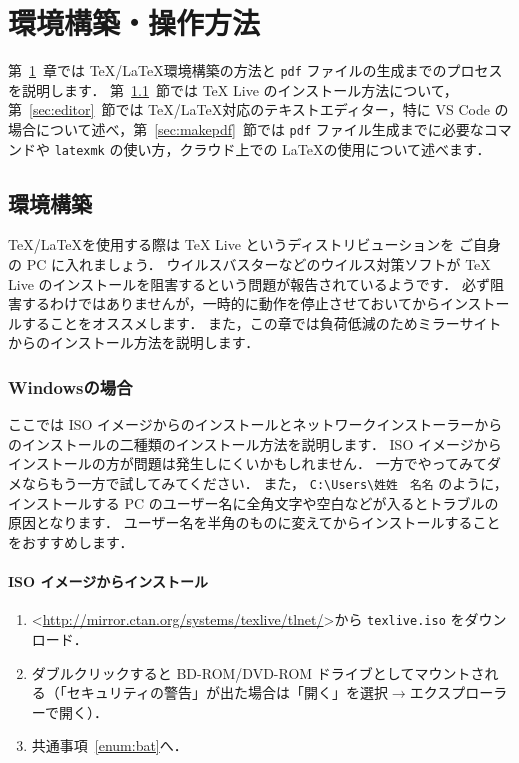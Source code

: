\chapter{環境構築・操作方法}
\label{ch:howtouse}

第~\ref{ch:howtouse}~章では \TeX/\LaTeX 環境構築の方法と \verb|pdf| ファイルの生成までのプロセスを説明します．
第~\ref{sec:environment}~節では TeX Live のインストール方法について，第~\ref{sec:editor}~節では \TeX/\LaTeX 対応のテキストエディター，特に VS Code の場合について述べ，第~\ref{sec:makepdf}~節では \verb|pdf| ファイル生成までに必要なコマンドや \verb|latexmk| の使い方，クラウド上での \LaTeX の使用について述べます．

\section{環境構築}
\label{sec:environment}

\TeX/\LaTeX を使用する際は TeX Live というディストリビューションを ご自身の PC に入れましょう．
ウイルスバスターなどのウイルス対策ソフトが TeX Live のインストールを阻害するという問題が報告されているようです．
必ず阻害するわけではありませんが，一時的に動作を停止させておいてからインストールすることをオススメします．
また，この章では負荷低減のためミラーサイトからのインストール方法を説明します．

\subsection{Windowsの場合}
\label{ssec:windows}

ここでは ISO イメージからのインストールとネットワークインストーラーからのインストールの二種類のインストール方法を説明します．
ISO イメージからインストールの方が問題は発生しにくいかもしれません．
一方でやってみてダメならもう一方で試してみてください．
また， \verb|C:\Users\姓姓　名名| のように，インストールする PC のユーザー名に全角文字や空白などが入るとトラブルの原因となります．
ユーザー名を半角のものに変えてからインストールすることをおすすめします．

\subsubsection*{ISO イメージからインストール}

\begin{enumerate}
    \item \textless\url{http://mirror.ctan.org/systems/texlive/tlnet/}\textgreater から \verb|texlive.iso| をダウンロード．
    \item ダブルクリックすると BD-ROM/DVD-ROM ドライブとしてマウントされる（「セキュリティの警告」が出た場合は「開く」を選択$\to$エクスプローラーで開く）．
    \item 共通事項~\ref{enum:bat}へ．
\end{enumerate}


